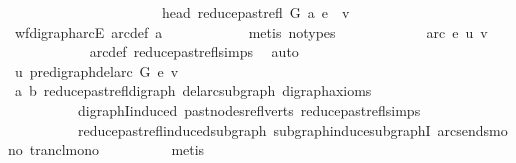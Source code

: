 \begin{isabellebody}
\ \ \ \ \ \ \ \ \ \ \ \ \ \ \ \ \ \ \ \ \ {\isasymand}\ head\ {\isacharparenleft}{\kern0pt}reduce{\isacharunderscore}{\kern0pt}past{\isacharunderscore}{\kern0pt}refl\ G\ a{\isacharparenright}{\kern0pt}\ e\ {\isacharequal}{\kern0pt}\ v{\isachardoublequoteclose}\isanewline
\ \ \ \ \ \ \ \ \ \ \isamarkupfalse%
\ wf{\isacharunderscore}{\kern0pt}digraph{\isachardot}{\kern0pt}arcE\ arc{\isacharunderscore}{\kern0pt}def\ a\isanewline
\ \ \ \ \ \ \ \ \ \ \isamarkupfalse%
\ {\isacharparenleft}{\kern0pt}metis\ {\isacharparenleft}{\kern0pt}no{\isacharunderscore}{\kern0pt}types{\isacharparenright}{\kern0pt}{\isacharparenright}{\kern0pt}\ \isanewline
\ \ \ \ \ \ \ \ \isamarkupfalse%
\ \isamarkupfalse%
\ {\isachardoublequoteopen}arc\ e\ {\isacharparenleft}{\kern0pt}u{\isacharcomma}{\kern0pt}\ v{\isacharparenright}{\kern0pt}{\isachardoublequoteclose}\isanewline
\ \ \ \ \ \ \ \ \ \ \isamarkupfalse%
\ arc{\isacharunderscore}{\kern0pt}def\ reduce{\isacharunderscore}{\kern0pt}past{\isacharunderscore}{\kern0pt}refl{\isachardot}{\kern0pt}simps\ \isamarkupfalse%
\ auto\isanewline
\ \ \ \ \ \ \isamarkupfalse%
\isanewline
\ \ \ \ \ \ \isamarkupfalse%
\ {\isachardoublequoteopen}u\ {\isasymrightarrow}\isactrlsup {\isacharplus}{\kern0pt}\isactrlbsub pre{\isacharunderscore}{\kern0pt}digraph{\isachardot}{\kern0pt}del{\isacharunderscore}{\kern0pt}arc\ G\ e\isactrlesub \ v{\isachardoublequoteclose}\isanewline
\ \ \ \ \ \ \ \ \isamarkupfalse%
\ a\ b\ reduce{\isacharunderscore}{\kern0pt}past{\isacharunderscore}{\kern0pt}refl{\isacharunderscore}{\kern0pt}digraph\ del{\isacharunderscore}{\kern0pt}arc{\isacharunderscore}{\kern0pt}subgraph\ digraph{\isacharunderscore}{\kern0pt}axioms\isanewline
\ \ \ \ \ \ \ \ \ \ digraphI{\isacharunderscore}{\kern0pt}induced\ past{\isacharunderscore}{\kern0pt}nodes{\isacharunderscore}{\kern0pt}refl{\isacharunderscore}{\kern0pt}verts\ reduce{\isacharunderscore}{\kern0pt}past{\isacharunderscore}{\kern0pt}refl{\isachardot}{\kern0pt}simps\isanewline
\ \ \ \ \ \ \ \ \ \ reduce{\isacharunderscore}{\kern0pt}past{\isacharunderscore}{\kern0pt}refl{\isacharunderscore}{\kern0pt}induced{\isacharunderscore}{\kern0pt}subgraph\ subgraph{\isacharunderscore}{\kern0pt}induce{\isacharunderscore}{\kern0pt}subgraphI\ arcs{\isacharunderscore}{\kern0pt}ends{\isacharunderscore}{\kern0pt}mono\ trancl{\isacharunderscore}{\kern0pt}mono\isanewline
\ \ \ \ \ \ \ \ \isamarkupfalse%
\ metis\isanewline
\ \ \ \ \ \ \isamarkupfalse%

\end{isabellebody}

